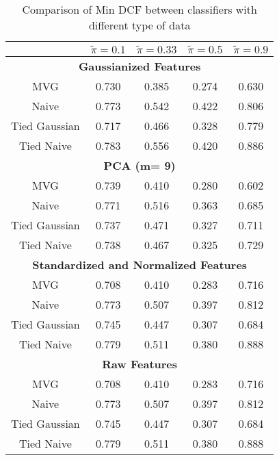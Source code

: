 \documentclass[12pt, twocolumn]{article}
\begin{document}
  \begin{table*}[t]
\caption{\label{tab:gaussian-comparison} Comparison of Min DCF between classifiers with different type of data }
\begin{center}
\begin{tabular}{ccccc}
\hline
\multicolumn{1}{l}{} & \textbf{$\tilde{\pi } = 0.1$} & \textbf{$\tilde{\pi } = 0.33$} & \textbf{$\tilde{\pi }= 0.5$} & \multicolumn{1}{l}{\textbf{$\tilde{\pi } = 0.9$}} \\ \hline
\multicolumn{5}{c}{\textbf{Gaussianized Features}}                 \\ \hline
\multicolumn{1}{c|}{MVG}           & 0.730 & 0.385 & 0.274 & 0.630 \\
\multicolumn{1}{c|}{Naive}         & 0.773 & 0.542 & 0.422 & 0.806 \\
\multicolumn{1}{c|}{Tied Gaussian} & 0.717 & 0.466 & 0.328 & 0.779 \\
\multicolumn{1}{c|}{Tied Naive}    & 0.783 & 0.556 & 0.420 & 0.886 \\ \hline
\multicolumn{5}{c}{\textbf{PCA (m= 9)}}                           \\ \hline
\multicolumn{1}{c|}{MVG}           & 0.739 & 0.410 & 0.280 & 0.602 \\
\multicolumn{1}{c|}{Naive}         & 0.771 & 0.516 & 0.363 & 0.685 \\
\multicolumn{1}{c|}{Tied Gaussian} & 0.737 & 0.471 & 0.327 & 0.711 \\
\multicolumn{1}{c|}{Tied Naive}    & 0.738 & 0.467 & 0.325 & 0.729 \\ \hline
\multicolumn{5}{c}{\textbf{Standardized and Normalized Features}}  \\ \hline
\multicolumn{1}{c|}{MVG}           & 0.708 & 0.410 & 0.283 & 0.716 \\
\multicolumn{1}{c|}{Naive}         & 0.773 & 0.507 & 0.397 & 0.812 \\
\multicolumn{1}{c|}{Tied Gaussian} & 0.745 & 0.447 & 0.307 & 0.684 \\
\multicolumn{1}{c|}{Tied Naive}    & 0.779 & 0.511 & 0.380 & 0.888 \\ \hline
\multicolumn{5}{c}{\textbf{Raw Features}}                          \\ \hline
\multicolumn{1}{c|}{MVG}           & 0.708 & 0.410 & 0.283 & 0.716 \\
\multicolumn{1}{c|}{Naive}         & 0.773 & 0.507 & 0.397 & 0.812 \\
\multicolumn{1}{c|}{Tied Gaussian} & 0.745 & 0.447 & 0.307 & 0.684 \\
\multicolumn{1}{c|}{Tied Naive}    & 0.779 & 0.511 & 0.380 & 0.888 \\ \hline

\end{tabular}
\end{center}
\end{table*}
\end{document}
